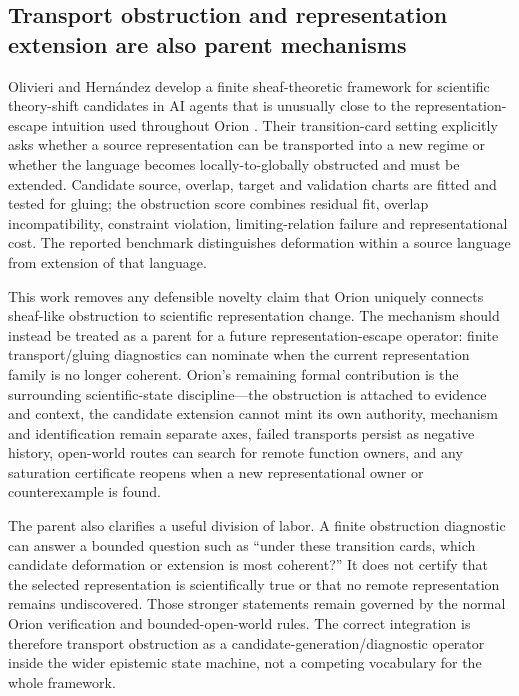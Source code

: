 \subsection{Transport obstruction and representation extension are also parent mechanisms}

Olivieri and Hern\'andez develop a finite sheaf-theoretic framework for scientific theory-shift candidates in AI agents that is unusually close to the representation-escape intuition used throughout Orion \cite{olivieri2026theoryshift}. Their transition-card setting explicitly asks whether a source representation can be transported into a new regime or whether the language becomes locally-to-globally obstructed and must be extended. Candidate source, overlap, target and validation charts are fitted and tested for gluing; the obstruction score combines residual fit, overlap incompatibility, constraint violation, limiting-relation failure and representational cost. The reported benchmark distinguishes deformation within a source language from extension of that language.

This work removes any defensible novelty claim that Orion uniquely connects sheaf-like obstruction to scientific representation change. The mechanism should instead be treated as a parent for a future representation-escape operator: finite transport/gluing diagnostics can nominate when the current representation family is no longer coherent. Orion's remaining formal contribution is the surrounding scientific-state discipline---the obstruction is attached to evidence and context, the candidate extension cannot mint its own authority, mechanism and identification remain separate axes, failed transports persist as negative history, open-world routes can search for remote function owners, and any saturation certificate reopens when a new representational owner or counterexample is found.

The parent also clarifies a useful division of labor. A finite obstruction diagnostic can answer a bounded question such as ``under these transition cards, which candidate deformation or extension is most coherent?'' It does not certify that the selected representation is scientifically true or that no remote representation remains undiscovered. Those stronger statements remain governed by the normal Orion verification and bounded-open-world rules. The correct integration is therefore transport obstruction as a candidate-generation/diagnostic operator inside the wider epistemic state machine, not a competing vocabulary for the whole framework.
